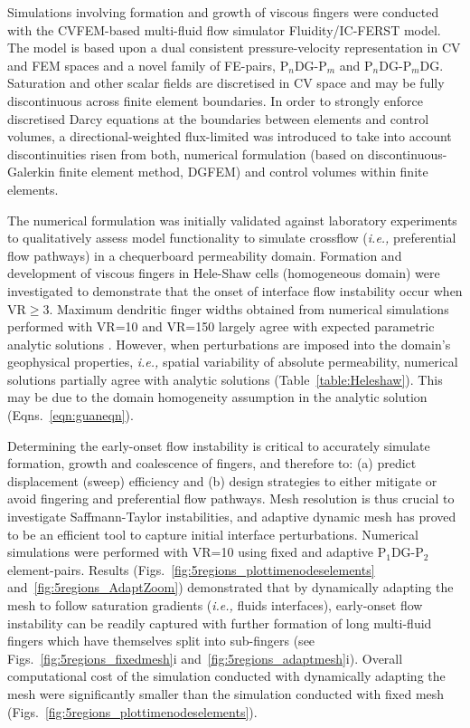 \documentclass[preprint,authoryear,12pt]{elsarticle}
\newcommand{\PN}[2][error]{P$_{#1}$DG-P$_{#2}$}
\newcommand{\PNDG}[2][error]{P$_{#1}$DG-P$_{#2}$DG}
\newcommand{\ie}{{\it i.e., }}
\begin{document}
Simulations involving formation and growth of viscous fingers were conducted with the CVFEM-based multi-fluid flow simulator Fluidity/IC-FERST model. The model is based upon a dual consistent pressure-velocity representation in CV and FEM spaces and a novel family of FE-pairs, \PN[n]{m} and \PNDG[n]{m}. Saturation and other scalar fields are discretised in CV space and may be fully discontinuous across finite element boundaries. In order to strongly enforce discretised Darcy equations at the boundaries between elements and control volumes, a directional-weighted flux-limited was introduced to take into account discontinuities risen from both, numerical formulation (based on discontinuous-Galerkin finite element method, DGFEM) and control volumes within finite elements.

The numerical formulation was initially validated against laboratory experiments \citep{dawe_2008} to qualitatively assess model functionality to simulate crossflow (\ie preferential flow pathways) in a chequerboard permeability domain. Formation and development of viscous fingers in Hele-Shaw cells (homogeneous domain) were investigated to demonstrate that the onset of interface flow instability occur when VR$\ge$3. Maximum dendritic finger widths obtained from numerical simulations performed with VR=10 and VR=150 largely agree with expected parametric analytic solutions \citep{mclean_1981,guan_2003}. However, when perturbations are imposed into the domain's geophysical properties, \ie spatial variability of absolute permeability, numerical solutions partially agree with analytic solutions (Table~\ref{table:Heleshaw}). This may be due to the domain homogeneity assumption in the analytic solution (Eqns.~\ref {eqn:guaneqn}).

Determining the early-onset flow instability is critical to accurately simulate formation, growth and coalescence of fingers, and therefore to: (a) predict displacement (sweep) efficiency and (b) design strategies to either mitigate or avoid fingering and preferential flow pathways. Mesh resolution is thus crucial to investigate Saffmann-Taylor instabilities, and adaptive dynamic mesh has proved to be an efficient tool to capture initial interface perturbations. Numerical simulations were performed with VR=10 using fixed and adaptive \PN[1]{2} element-pairs. Results (Figs.~\ref{fig:5regions_plottimenodeselements} and~\ref{fig:5regions_AdaptZoom}) demonstrated that by dynamically adapting the mesh to follow saturation gradients (\ie fluids interfaces), early-onset flow instability can be readily captured with further formation of long multi-fluid fingers which have themselves split into sub-fingers (see Figs.~\ref{fig:5regions_fixedmesh}i and~\ref{fig:5regions_adaptmesh}i). Overall computational cost of the simulation conducted with dynamically adapting the mesh were significantly smaller than the simulation conducted with fixed mesh (Figs.~\ref{fig:5regions_plottimenodeselements}).
\end{document}

